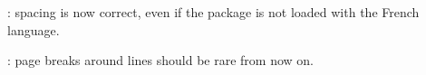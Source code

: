 \documentclass[12pt, a4paper]{article}
\begin{document}
\begin{tdocfix}
	\item {}: spacing is now correct, even if the  package is not loaded with the French language.

	\item {}: page breaks around  lines should be rare from now on.
\end{tdocfix}
\end{document}
